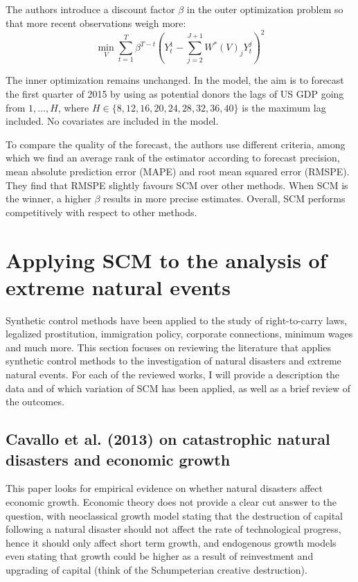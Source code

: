 \documentclass[12pt,a4paper,draft]{article}
\begin{document}
The authors introduce a discount factor $\beta$ in the outer optimization problem 
so that more recent observations weigh more:
\begin{equation}
    \min_{V} 
    \sum_{t=1}^{T} {\beta^{T-t} \left( Y^1_t - 
    \sum_{j=2}^{J+1} {W^*(V)_j Y^j_t} \right)^2}
\end{equation}

The inner optimization remains unchanged. 
In the model, the aim is to forecast the first quarter of 2015 by using as 
potential donors the lags of US GDP going 
from $1, \dots, H$, where $H\in\{8,12,16,20,24,28,32,36,40\}$ is 
the maximum lag included. No covariates are included in the model. 

To compare the quality of the forecast, the authors use different criteria, among 
which we find an average rank of the estimator according to forecast precision,
mean absolute prediction error (MAPE) and root mean squared error (RMSPE).
They find that RMSPE slightly favours SCM over other methods. When SCM is the 
winner, a higher $\beta$ results in more precise estimates. Overall, SCM performs 
competitively with respect to other methods. 












\section{Applying SCM to the analysis of extreme natural events}
Synthetic control methods have been applied to the study of right-to-carry laws, 
legalized prostitution, immigration policy, corporate connections, minimum wages and 
much more. This section focuses on reviewing the literature that applies synthetic 
control methods to the investigation of natural disasters and extreme natural 
events. For each of the reviewed works, I will provide a description the data 
and of which variation of SCM has been applied, as well as a brief review of 
the outcomes. 



\subsection{Cavallo et al. (2013) on catastrophic natural disasters and economic growth}
This paper looks for empirical evidence on whether natural disasters affect economic growth.
Economic theory does not provide a clear cut answer to the question, with neoclassical 
growth model stating that the destruction of capital following a natural disaster should 
not affect the rate of technological progress, hence it should only affect short term 
growth, and endogenous growth models even stating that growth could be higher as a result 
of reinvestment and upgrading of capital (think of the Schumpeterian creative destruction).
\end{document}
